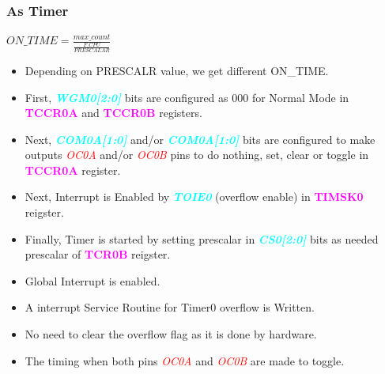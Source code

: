 \documentclass{article}
\newcommand{\bitFormat}[1]{\emph{\textbf{\textcolor{cyan}{#1}}}}
\newcommand{\regFormat}[1]{\textbf{\textcolor{magenta}{#1}}}
\newcommand{\pinFormat}[1]{\emph{\textcolor{red}{#1}}}
\begin{document}
\subsubsection{As Timer}
\begin{center}
    $ON\_TIME = \frac{max\_count}{\frac{F\_CPU}{PRESCALAR}}$
\end{center}
\begin{itemize}
    \item Depending on PRESCALR value, we get different ON\_TIME.
    \item First, \bitFormat{WGM0[2:0]} bits are configured as 000 for Normal Mode in \regFormat{TCCR0A} and \regFormat{TCCR0B} registers.
    \item Next, \bitFormat{COM0A[1:0]} and/or \bitFormat{COM0A[1:0]} bits are configured to make outputs \pinFormat{OC0A} and/or \pinFormat{OC0B} pins to do nothing, set, clear or toggle in \regFormat{TCCR0A} register.
    \item Next, Interrupt is Enabled by \bitFormat{TOIE0} (overflow enable) in \regFormat{TIMSK0} reigster.
    \item Finally, Timer is started by setting prescalar in \bitFormat{CS0[2:0]} bits as needed prescalar of \regFormat{TCR0B} reigster.
    \item Global Interrupt is enabled.
    \item A interrupt Service Routine for Timer0 overflow is Written.
    \item No need to clear the overflow flag as it is done by hardware.
    \item The timing when both pins \pinFormat{OC0A} and \pinFormat{OC0B} are made to toggle.
\end{itemize}
\end{document}
